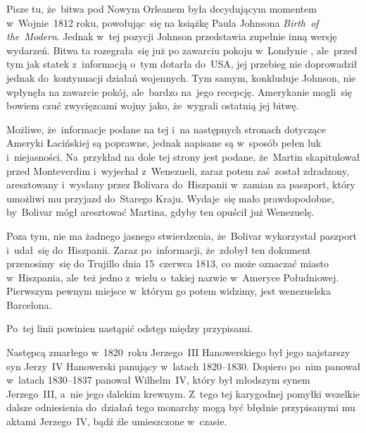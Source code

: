 \documentclass[a4paper,11pt]{article}
\begin{document}
\start {} Pisze tu, że~bitwa pod Nowym Orleanem była decydującym
momentem w~Wojnie~1812 roku, powołując~się na książkę Paula Johnsona
\textit{Birth~of the~Modern}. Jednak w~tej pozycji Johnson przedstawia
zupełnie inną wersję wydarzeń. Bitwa ta rozegrała~się już po zawarciu
pokoju w~Londynie , ale~przed tym jak statek
z~informacją o~tym dotarła do~USA, jej przebieg nie doprowadził jednak
do~kontynuacji działań wojennych. Tym samym, konkluduje Johnson, nie
wpłynęła na zawarcie pokój, ale~bardzo na~jego recepcję. Amerykanie
mogli~się bowiem czuć zwycięzcami wojny jako, że~wygrali ostatnią jej
bitwę.

\vspace{\spaceFour}



\start {} Możliwe, że~informacje podane na tej i~na następnych
stronach dotyczące Ameryki Łacińskiej są poprawne, jednak napisane są
w~sposób pełen luk i~niejasności. Na~przykład na dole tej strony jest
podane, że~Martin skapitulował przed Monteverdim i~wyjechał
z~Wenezueli, zaraz potem zaś~został zdradzony, aresztowany i~wysłany
przez Bolivara do~Hiszpanii w~zamian za paszport, który umożliwi mu
przyjazd do~Starego Kraju. Wydaje~się mało prawdopodobne, by~Bolivar
mógł aresztować Martina, gdyby ten opuścił już Wenezuelę.

Poza tym, nie ma żadnego jasnego stwierdzenia, że~Bolivar wykorzystał
paszport i~udał~się do~Hiszpanii. Zaraz po~informacji, że~zdobył ten
dokument przenosimy~się do Trujillo dnia 15~czerwca 1813, co może
oznaczać miasto w~Hiszpania, ale~też jedno z~wielu o~takiej nazwie
w~Ameryce Południowej. Pierwszym pewnym miejsce w~którym go potem
widzimy, jest wenezuelska Barcelona.

\vspace{\spaceFour}



\start {} Po~tej linii powinien nastąpić odstęp między
przypisami.

\vspace{\spaceFour}



\start {} Następcą zmarłego w~1820~roku Jerzego~III
Hanowerskiego był jego najstarszy syn Jerzy~IV Hanowerski panujący
w~latach 1820--1830. Dopiero po~nim panował w~latach 1830--1837 panował
Wilhelm~IV, który był młodszym synem Jerzego~III, a~nie jego dalekim
krewnym. Z~tego tej karygodnej pomyłki wszelkie dalsze odniesienia
do~działań tego monarchy mogą być błędnie przypisanymi mu aktami
Jerzego~IV, bądź źle umieszczone w~czasie.
\end{document}
